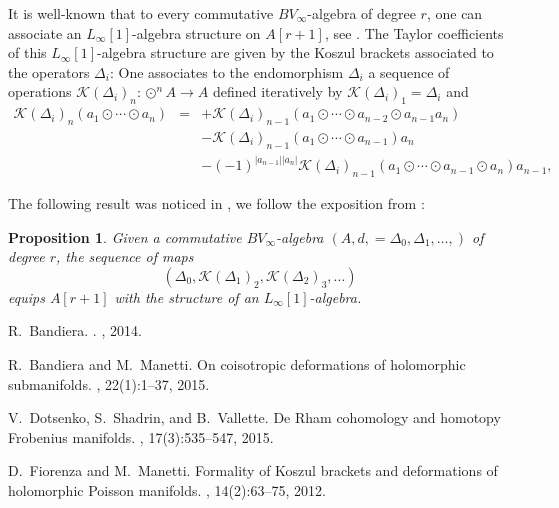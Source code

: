 \documentclass[11pt,thmsa]{amsart}
\newtheorem{proposition}[theorem]{Proposition}
\theoremstyle{definition}
\newcommand{\Koszul}{\mathcal{K}}
\begin{document}
It is well-known that to every commutative $BV_\infty$-algebra of degree $r$,
one can associate an $L_\infty[1]$-algebra structure on $A[r+1]$, see 
\cite{Voronov1,Bandiera_PhD-thesis}. 
The Taylor coefficients of this $L_\infty[1]$-algebra structure are given by
the Koszul brackets associated to the operators $\Delta_i$:
One associates to the endomorphism $\Delta_i$ a sequence
of operations $\Koszul(\Delta_i)_n: \odot^n A\to A$ defined iteratively by
$\Koszul(\Delta_i)_1=\Delta_i$ and
\begin{eqnarray*}
\Koszul(\Delta_i)_n(a_1\odot \cdots \odot a_n) &=& +\Koszul(\Delta_i)_{n-1}(a_1\odot \cdots \odot a_{n-2}\odot a_{n-1}a_n)\\
&& - \Koszul(\Delta_i)_{n-1}(a_1\odot \cdots \odot a_{n-1})a_n\\
&&-(-1)^{|a_{n-1}||a_n|}\Koszul(\Delta_i)_{n-1}(a_1\odot \cdots \odot a_{n-1}\odot a_n)a_{n-1},
\end{eqnarray*}

{ The following result was noticed in \cite{Voronov1}, we follow the exposition from \cite[Proposition 4.2.21]{Bandiera_PhD-thesis}:}

\begin{proposition}\label{proposition: Koszul brackets}
Given a commutative $BV_\infty$-algebra $(A,d,=\Delta_0,\Delta_1,\dots,)$ of degree $r$, the sequence of maps
$$(\Delta_0,\Koszul(\Delta_1)_2,\Koszul(\Delta_2)_3,\dots)$$
equips $A[r+1]$ with the structure of an $L_\infty[1]$-algebra.
\end{proposition}
 
 
 
%

 
R.~Bandiera.
.
, 2014.

R.~Bandiera and M.~Manetti.
\newblock On coisotropic deformations of holomorphic submanifolds.
, 22(1):1--37, 2015.

V.~Dotsenko, S.~Shadrin, and B.~Vallette.
\newblock De {R}ham cohomology and homotopy {F}robenius manifolds.
, 17(3):535--547, 2015.

D.~Fiorenza and M.~Manetti.
\newblock Formality of {K}oszul brackets and deformations of holomorphic
  {P}oisson manifolds.
, 14(2):63--75, 2012.
\end{document}
